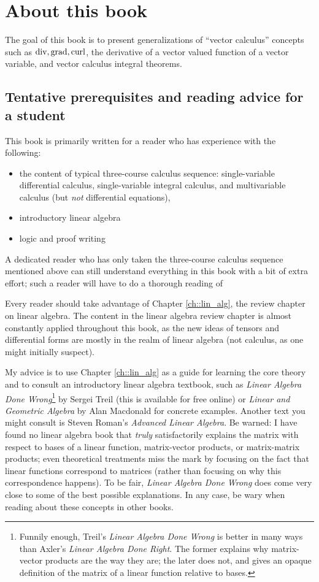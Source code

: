 \chapter*{About this book}

The goal of this book is to present generalizations of ``vector calculus'' concepts such as $\text{div}, \text{grad}, \text{curl}$, the derivative of a vector valued function of a vector variable, and vector calculus integral theorems.

\section*{Tentative prerequisites and reading advice for a student}

This book is primarily written for a reader who has experience with the following:

\begin{itemize}
    \item the content of typical three-course calculus sequence: single-variable differential calculus, single-variable integral calculus, and multivariable calculus (but \textit{not} differential equations),
    \item introductory linear algebra
    \item logic and proof writing
\end{itemize}

A dedicated reader who has only taken the three-course calculus sequence mentioned above can still understand everything in this book with a bit of extra effort; such a reader will have to do a thorough reading of 

Every reader should take advantage of Chapter \ref{ch::lin_alg}, the review chapter on linear algebra. The content in the linear algebra review chapter is almost constantly applied throughout this book, as the new ideas of tensors and differential forms are mostly in the realm of linear algebra (not calculus, as one might initially suspect).

My advice is to use Chapter \ref{ch::lin_alg} as a guide for learning the core theory and to consult an introductory linear algebra textbook, such as \textit{Linear Algebra Done Wrong}\footnote{Funnily enough, Treil's \textit{Linear Algebra Done Wrong} is better in many ways than Axler's \textit{Linear Algebra Done Right}. The former explains why matrix-vector products are the way they are; the later does not, and gives an opaque definition of the matrix of a linear function relative to bases.} by Sergei Treil (this is available for free online) or \textit{Linear and Geometric Algebra} by Alan Macdonald for concrete examples. Another text you might consult is Steven Roman's \textit{Advanced Linear Algebra}. Be warned: I have found no linear algebra book that \textit{truly} satisfactorily explains the matrix with respect to bases of a linear function, matrix-vector products, or matrix-matrix products; even theoretical treatments miss the mark by focusing on the fact that linear functions correspond to matrices (rather than focusing on why this correspondence happens). To be fair, \textit{Linear Algebra Done Wrong} does come very close to some of the best possible explanations. In any case, be wary when reading about these concepts in other books.